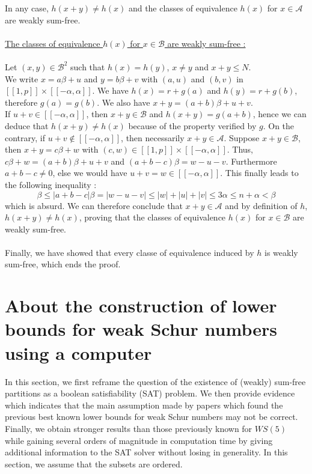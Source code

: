 \documentclass{article}
\newtheorem{computational theorem}{Computational Theorem}[theorem]
\begin{document}
In any case, $h(x+y) \neq h(x)$ and the classes of equivalence $h(x)$ for $x \in \mathcal{A}$ are weakly sum-free.\\
\\
\underline{The classes of equivalence $h(x)$ for $x \in \mathcal{B}$ are weakly sum-free :}
\\
\\
Let $(x,y) \in \mathcal{B}^2$ such that $h(x) = h(y)$, $x \neq y$ and $x + y \leqslant N$.\\
We write $x = a\beta + u$ and $y = b\beta + v$ with $(a,u)$ and $(b,v)$ in $[\![1,p]\!] \times [\![-\alpha,\alpha]\!]$. We have $h(x) = r + g(a)$ and $h(y) = r + g(b)$, therefore $g(a) = g(b)$. We also have $x+y = (a+b)\beta + u +v$.\\
If $u + v \in [\![-\alpha,\alpha]\!]$, then $x+y \in \mathcal{B}$ and $h(x+y) = g(a+b)$, hence we can deduce that $h(x+y) \neq h(x)$ because of the property verified by $g$. On the contrary, if $u+v \notin [\![-\alpha,\alpha]\!]$, then necessarily $x+y \in \mathcal{A}$. Suppose $x+y \in \mathcal{B}$, then $x+y = c\beta + w$ with $(c,w) \in [\![1,p]\!] \times [\![-\alpha,\alpha]\!]$. Thus, $c\beta + w = (a+b)\beta + u + v$ and $(a+b-c)\beta = w-u-v$. Furthermore $a+b-c \neq 0$, else we would have $u+v = w \in [\![-\alpha,\alpha]\!]$. This finally leads to the following inequality :
\[\beta \leqslant |a+b-c|\beta = |w-u-v| \leqslant |w| + |u| + |v| \leqslant 3\alpha \leqslant n + \alpha < \beta
\]
which is absurd. We can therefore conclude that $x+y \in \mathcal{A}$ and by definition of $h$, $h(x+y) \neq h(x)$, proving that the classes of equivalence $h(x)$ for $x \in \mathcal{B}$ are weakly sum-free.\\
\\
Finally, we have showed that every classe of equivalence induced by $h$ is weakly sum-free, which ends the proof.



\section{About the construction of lower bounds for weak Schur numbers using a computer}

In this section, we first reframe the question of the existence of (weakly) sum-free partitions as a boolean
satisfiability (SAT) problem. We then provide evidence which indicates that the main assumption made by papers which
found the previous best known lower bounds for weak Schur numbers may not be correct. Finally, we obtain stronger
results than those previously known for \(WS(5)\) while gaining several orders of magnitude in computation time by 
giving additional information to the SAT solver without losing in generality. In this section, we assume that the subsets are ordered.
\end{document}
